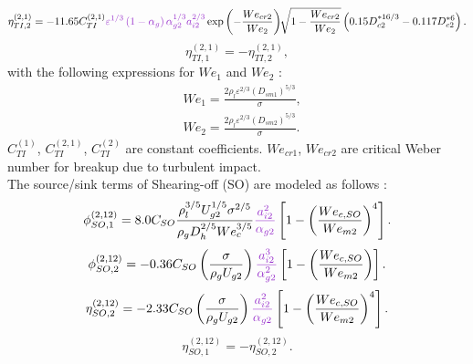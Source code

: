  \begin{equation}
\eta_{TI,2}^{(2,1)} = -11.65 C_{TI}^{(2,1)}{\color{mydarkorchid} \varepsilon^{1/3} \left( 1 - \alpha_g \right) \alpha_{g2}^{1/3} a_{i2}^{2/3} }\exp \left( - \frac{ We_{cr2} }{ We_2 } \right) \sqrt[]{ 1 - \frac{ We_{cr2} }{ We_2 } } \left( 0.15 D_{c2}^{*16/3} - 0.117 D_{c2}^{*6} \right).
 \end{equation}
 \begin{equation}
 \eta_{TI,1}^{(2,1)} = - \eta_{TI,2}^{(2,1)},
 \end{equation}
with the following expressions for $We_1$ and $We_2$ :
 \begin{align*}
 & We_1 = \frac{2 \rho_l \varepsilon^{2/3} (D_{sm1})^{5/3} }{\sigma}, \\
 & We_2 = \frac{2 \rho_l \varepsilon^{2/3} (D_{sm2})^{5/3} }{\sigma}.
 \end{align*}
$C_{TI}^{(1)}$, $C_{TI}^{(2,1)}$, $C_{TI}^{(2)}$ are constant coefficients. $We_{cr1}$, $We_{cr2}$ are critical Weber number for breakup due to turbulent impact.\\
The source/sink terms of Shearing-off (SO) are modeled as follows :
 \begin{equation}
 \phi_{SO,1}^{(2,12)} = 8.0 C_{SO} \frac{ \rho_l^{3/5} U_{g2}^{1/5} \sigma^{2/5} }{ \rho_g D_h^{2/5} We_c^{3/5} } {\color{mydarkorchid}\frac{ a_{i2}^2 }{ \alpha_{g2} }} \left[ 1 - \left( \frac{ We_{c,SO} }{ We_{m2} } \right)^4 \right] .
  \end{equation}
 \begin{equation}
\phi_{SO,2}^{(2,12)} = -0.36 C_{SO} \left( \frac{ \sigma }{ \rho_g U_{g2} }  \right) {\color{mydarkorchid} \frac{ a_{i2}^3 }{ \alpha_{g2}^2 } }\left[ 1 - \left( \frac{ We_{c,SO} }{ We_{m2} } \right) \right].
  \end{equation}
 \begin{equation}
  \eta_{SO,2}^{(2,12)} = - 2.33 C_{SO} \left( \frac{ \sigma }{ \rho_g U_{g2} }  \right){\color{mydarkorchid} \frac{ a_{i2}^2 }{ \alpha_{g2} }} \left[ 1 - \left( \frac{ We_{c,SO} }{ We_{m2} } \right)^4 \right].
\end{equation}
 \begin{equation}
 \eta_{SO,1}^{(2,12)} = - \eta_{SO,2}^{(2,12)}.
 \end{equation}

